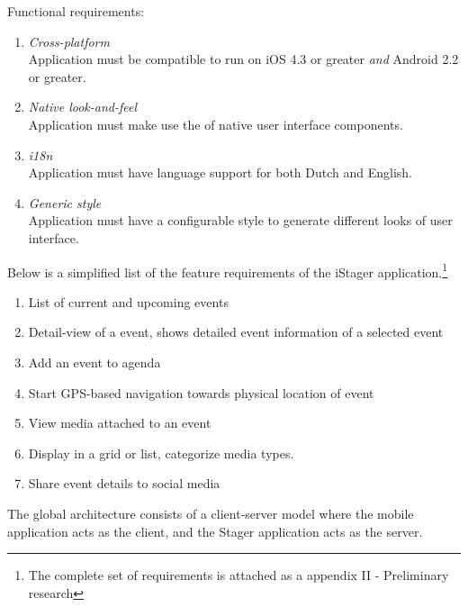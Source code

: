 Functional requirements:
\begin{enumerate}
\item \emph{Cross-platform}\\Application must be compatible to run on iOS 4.3 or greater \emph{and} Android 2.2 or greater.
\item \emph{Native look-and-feel}\\Application must make use the of native user interface components.
\item \emph{i18n}\\Application must have language support for both Dutch and English.
\item \emph{Generic style}\\Application must have a configurable style to generate different looks of user interface.
\end{enumerate}

\noindent Below is a simplified list of the feature requirements of the iStager application.\footnote{The complete set of requirements is attached as a appendix II - Preliminary research}
\begin{enumerate}
\item
List of current and upcoming events
\item
Detail-view of a event, shows detailed event information of a selected event
\item
Add an event to agenda
\item
Start GPS-based navigation towards physical location of event
\item
View media attached to an event
\item
Display in a grid or list, categorize media types.
\item
Share event details to social media
\end{enumerate}

The global architecture consists of a client-server model where the mobile application acts as the client, and the Stager application acts as the server.

